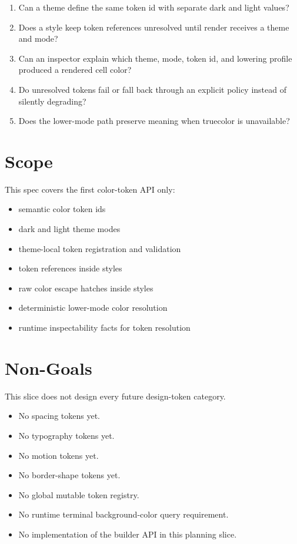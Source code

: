 \begin{enumerate}
\def\labelenumi{\arabic{enumi}.}
\tightlist
\item
  Can a theme define the same token id with separate dark and light values?
\item
  Does a style keep token references unresolved until render receives a theme and mode?
\item
  Can an inspector explain which theme, mode, token id, and lowering profile produced a rendered cell color?
\item
  Do unresolved tokens fail or fall back through an explicit policy instead of silently degrading?
\item
  Does the lower-mode path preserve meaning when truecolor is unavailable?
\end{enumerate}

\section{Scope}\label{record-178-scope}

This spec covers the first color-token API only:

\begin{itemize}
\tightlist
\item
  semantic color token ids
\item
  dark and light theme modes
\item
  theme-local token registration and validation
\item
  token references inside styles
\item
  raw color escape hatches inside styles
\item
  deterministic lower-mode color resolution
\item
  runtime inspectability facts for token resolution
\end{itemize}

\section{Non-Goals}\label{record-178-non-goals}

This slice does not design every future design-token category.

\begin{itemize}
\tightlist
\item
  No spacing tokens yet.
\item
  No typography tokens yet.
\item
  No motion tokens yet.
\item
  No border-shape tokens yet.
\item
  No global mutable token registry.
\item
  No runtime terminal background-color query requirement.
\item
  No implementation of the builder API in this planning slice.
\end{itemize}

